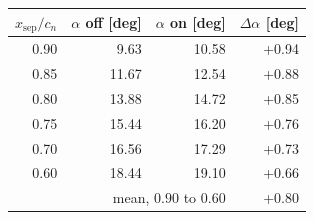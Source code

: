 \begin{tabular}{rrrr}
  \hline
  $x_{\mathrm{sep}}/c_n$ & $\alpha$ off [deg] & $\alpha$ on [deg] & $\Delta\alpha$ [deg] \\
  \hline
  0.90 & 9.63 & 10.58 & +0.94 \\
  0.85 & 11.67 & 12.54 & +0.88 \\
  0.80 & 13.88 & 14.72 & +0.85 \\
  0.75 & 15.44 & 16.20 & +0.76 \\
  0.70 & 16.56 & 17.29 & +0.73 \\
  0.60 & 18.44 & 19.10 & +0.66 \\
  \hline
  \multicolumn{3}{r}{mean, $0.90$ to $0.60$} & +0.80 \\
  \hline
\end{tabular}
